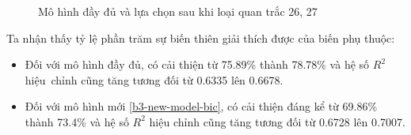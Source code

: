 \begin{figure}[H]
	\centering
	\hfill
	\caption{Mô hình đầy đủ và lựa chọn sau khi loại quan trắc 26, 27}
	\label{fig-b3:new-models}
\end{figure}

Ta nhận thấy tỷ lệ phần trăm sự biến thiên giải thích được của biến phụ thuộc:
\begin{itemize}
	\item Đối với mô hình đầy đủ, có cải thiện từ 75.89\% thành 78.78\% và hệ số $R^2$ hiệu~chỉnh cũng tăng tương đối từ 0.6335 lên 0.6678. 
	\item Đối với mô hình mới \ref{b3-new-model-bic}, có cải thiện đáng kể từ 69.86\% thành 73.4\% và hệ số $R^2$ hiệu chỉnh cũng tăng tương đối từ 0.6728 lên 0.7007. 
\end{itemize}

